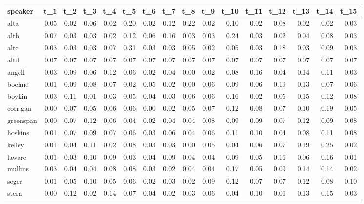 \begin{tabular}{lrrrrrrrrrrrrrrr}
\toprule
   speaker &  t\_1 &  t\_2 &  t\_3 &  t\_4 &  t\_5 &  t\_6 &  t\_7 &  t\_8 &  t\_9 &  t\_10 &  t\_11 &  t\_12 &  t\_13 &  t\_14 &  t\_15 \\
\midrule
      alta & 0.05 & 0.02 & 0.06 & 0.02 & 0.20 & 0.02 & 0.12 & 0.22 & 0.02 &  0.10 &  0.02 &  0.08 &  0.02 &  0.02 &  0.03 \\
      altb & 0.07 & 0.03 & 0.03 & 0.02 & 0.12 & 0.06 & 0.16 & 0.03 & 0.03 &  0.24 &  0.03 &  0.02 &  0.04 &  0.08 &  0.03 \\
      altc & 0.03 & 0.03 & 0.03 & 0.07 & 0.31 & 0.03 & 0.03 & 0.05 & 0.02 &  0.05 &  0.03 &  0.18 &  0.03 &  0.09 &  0.03 \\
      altd & 0.07 & 0.07 & 0.07 & 0.07 & 0.07 & 0.07 & 0.07 & 0.07 & 0.07 &  0.07 &  0.07 &  0.07 &  0.07 &  0.07 &  0.07 \\
    angell & 0.03 & 0.09 & 0.06 & 0.12 & 0.06 & 0.02 & 0.04 & 0.00 & 0.02 &  0.08 &  0.16 &  0.04 &  0.14 &  0.11 &  0.03 \\
    boehne & 0.01 & 0.09 & 0.08 & 0.07 & 0.02 & 0.05 & 0.02 & 0.00 & 0.06 &  0.09 &  0.06 &  0.19 &  0.13 &  0.07 &  0.06 \\
    boykin & 0.03 & 0.11 & 0.01 & 0.03 & 0.05 & 0.04 & 0.03 & 0.06 & 0.06 &  0.16 &  0.02 &  0.05 &  0.15 &  0.12 &  0.08 \\
  corrigan & 0.00 & 0.07 & 0.05 & 0.06 & 0.06 & 0.00 & 0.02 & 0.05 & 0.07 &  0.12 &  0.08 &  0.07 &  0.10 &  0.19 &  0.05 \\
 greenspan & 0.00 & 0.07 & 0.12 & 0.06 & 0.04 & 0.02 & 0.04 & 0.04 & 0.08 &  0.09 &  0.09 &  0.07 &  0.12 &  0.09 &  0.08 \\
   hoskins & 0.01 & 0.07 & 0.09 & 0.07 & 0.06 & 0.03 & 0.06 & 0.04 & 0.06 &  0.11 &  0.10 &  0.04 &  0.08 &  0.11 &  0.08 \\
    kelley & 0.01 & 0.04 & 0.11 & 0.02 & 0.08 & 0.03 & 0.03 & 0.00 & 0.05 &  0.04 &  0.06 &  0.07 &  0.19 &  0.25 &  0.02 \\
    laware & 0.01 & 0.03 & 0.10 & 0.09 & 0.03 & 0.04 & 0.09 & 0.04 & 0.04 &  0.09 &  0.05 &  0.16 &  0.06 &  0.16 &  0.01 \\
   mullins & 0.03 & 0.04 & 0.04 & 0.08 & 0.08 & 0.03 & 0.02 & 0.04 & 0.04 &  0.17 &  0.05 &  0.09 &  0.14 &  0.14 &  0.02 \\
     seger & 0.01 & 0.05 & 0.10 & 0.05 & 0.06 & 0.02 & 0.03 & 0.02 & 0.09 &  0.12 &  0.07 &  0.07 &  0.12 &  0.08 &  0.10 \\
     stern & 0.00 & 0.12 & 0.02 & 0.14 & 0.07 & 0.04 & 0.02 & 0.03 & 0.06 &  0.04 &  0.10 &  0.06 &  0.13 &  0.15 &  0.03 \\
\bottomrule
\end{tabular}
